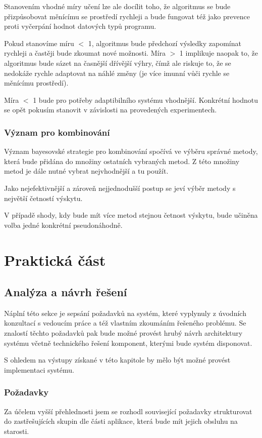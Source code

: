 \documentclass[thesis=M,czech]{FITthesis}[2014/05/07]
\begin{document}
Stanovením vhodné míry učení lze ale docílit toho, že algoritmus se bude přizpůsobovat měnícímu se prostředí rychleji a bude fungovat též jako prevence proti vyčerpání hodnot datových typů programu.

Pokud stanovíme míru $<$ 1, algoritmus bude předchozí výsledky zapomínat rychleji a častěji bude zkoumat nové možnosti. Míra $>$ 1 implikuje naopak to, že algoritmus bude sázet na časnější dřívější výhry, čímž ale riskuje to, že se nedokáže rychle adaptovat na náhlé změny (je více imunní vůči rychle se měnícímu prostředí).

Míra $<$ 1 bude pro potřeby adaptibilního systému vhodnější. Konkrétní hodnotu se opět pokusím stanovit v závislosti na provedených experimentech.

\subsection{Význam pro kombinování}
\label{lkombinování}
Význam bayesovské strategie pro kombinování spočívá ve výběru správné metody, která bude přidána do množiny ostatních vybraných metod. Z této množiny metod je dále nutné vybrat nejvhodnější a tu použít.

Jako nejefektivnější a zároveň nejjednodušší postup se jeví výběr metody s největší četností výskytu. 

V případě shody, kdy bude mít více metod stejnou četnost výskytu, bude učiněna volba jedné konkrétní pseudonáhodně.

\chapter{Praktická část}
\label{chap:prakt}
\section{Analýza a návrh řešení}
\label{chap:analysis}
Náplní této sekce je sepsání požadavků na systém, které vyplynuly z úvodních konzultací s vedoucím práce a též vlastním zkoumáním řešeného problému. Se znalostí těchto požadavků pak bude možné provést hrubý návrh architektury systému včetně technického řešení komponent, kterými bude systém disponovat.

S ohledem na výstupy získané v této kapitole by mělo být možné provést implementaci systému.

\subsection{Požadavky}
\label{sec:req}
Za účelem vyšší přehlednosti jsem se rozhodl související požadavky strukturovat do zastřešujících skupin dle části aplikace, která bude mít jejich obsluhu na starosti.
\end{document}
